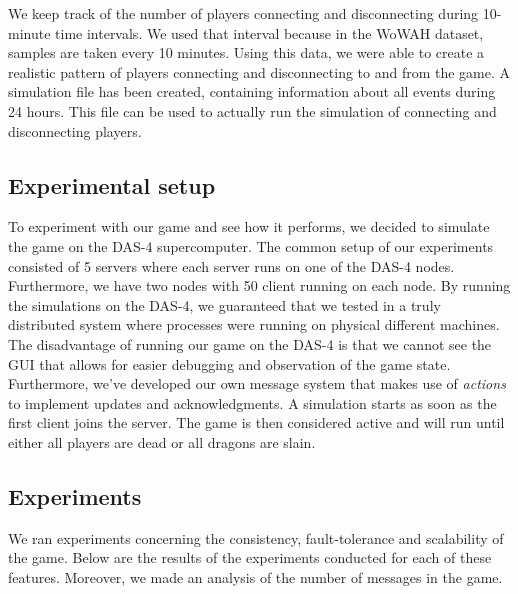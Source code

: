 We keep track of the number of players connecting and disconnecting during 10-minute time intervals.
We used that interval because in the WoWAH dataset, samples are taken every 10 minutes.
Using this data, we were able to create a realistic pattern of players connecting and disconnecting to and from the game.
A simulation file has been created, containing information about all events during 24 hours. This file can be used to actually run the simulation of connecting and disconnecting players.

\subsection{Experimental setup}
\label{subsec:experimental_setup}

	To experiment with our game and see how it performs, we decided to simulate the game on the DAS-4 supercomputer.
	The common setup of our experiments consisted of 5 servers where each server runs on one of the DAS-4 nodes. Furthermore, we have two nodes with 50 client running on each node.
	By running the simulations on the DAS-4, we guaranteed that we tested in a truly distributed system where processes were running on physical different machines.
	The disadvantage of running our game on the DAS-4 is that we cannot see the GUI that allows for easier debugging and observation of the game state.
	Furthermore, we've developed our own message system that makes use of \emph{actions} to implement updates and acknowledgments.
	A simulation starts as soon as the first client joins the server. The game is then considered active and will run until either all players are dead or all dragons are slain.


\subsection{Experiments}
\label{subsec:experiments}
	We ran experiments concerning the consistency, fault-tolerance and scalability of the game. Below are the results of the experiments conducted for each of these features. Moreover, we made an analysis of the number of messages in the game.

